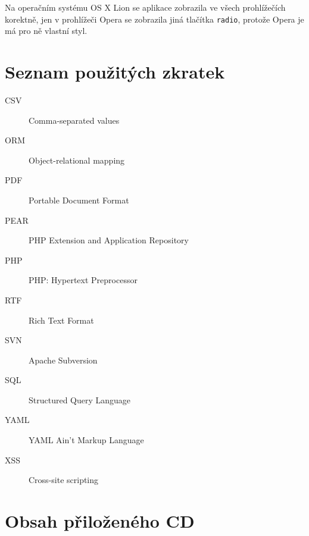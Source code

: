 \documentclass[thesis=B,czech]{FITthesis}[2012/04/27]
\begin{document}
Na operačním systému OS X Lion se aplikace zobrazila ve všech prohlížečích korektně, jen v prohlížeči Opera se zobrazila jiná tlačítka \texttt{radio}, protože Opera je má pro ně vlastní styl.
 









\begin{conclusion}
\end{conclusion}




\appendix

\chapter{Seznam použitých zkratek}
\begin{description}
	\item[CSV] Comma-separated values
	\item[ORM] Object-relational mapping
	\item[PDF] Portable Document Format
	\item [PEAR] PHP Extension and Application Repository
	\item[PHP] PHP: Hypertext Preprocessor
	\item[RTF] Rich Text Format
	\item[SVN] Apache Subversion
	\item[SQL] Structured Query Language
	\item[YAML] YAML Ain't Markup Language
	\item[XSS] Cross-site scripting
\end{description}


\chapter{Obsah přiloženého CD}


\begin{figure}
\end{figure}
\end{document}
